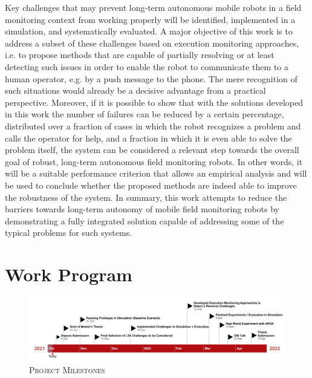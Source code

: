 \documentclass[english, master, expose, utf8]{base/thesis_KBS}
\begin{document}
Key challenges that may prevent long-term autonomous mobile robots in a field monitoring context from working properly will be identified, implemented 
in a simulation, and systematically evaluated. A major objective of this work is to address a subset of these challenges based on execution monitoring approaches,
i.e. to propose methods that are capable of partially resolving or at least detecting such issues in order to enable the robot to communicate them to a human operator,
e.g. by a push message to the phone. The mere recognition of such situations would already be a decisive advantage from a practical perspective. Moreover, if it is possible
to show that with the solutions developed in this work the number of failures can be reduced by a certain percentage, distributed over a fraction of cases in which the robot 
recognizes a problem and calls the operator for help, and a fraction in which it is even able to solve the problem itself, the system can be considered a relevant step towards 
the overall goal of robust, long-term autonomous field monitoring robots. In other words, it will be a suitable performance criterion that allows an empirical analysis
and will be used to conclude whether the proposed methods are indeed able to improve the robustness of the system.
In summary, this work attempts to reduce the barriers towards long-term autonomy of mobile field monitoring robots by demonstrating a fully integrated solution capable
of addressing some of the typical problems for such systems.

\section{Work Program}

\begin{figure}[H]
    \includegraphics[width=\textwidth]{pics/work_program.png}
    \caption{\textsc{Project Milestones}}
    \label{fig:work_program}
\end{figure}


\end{document}
